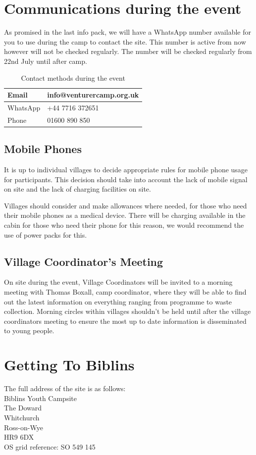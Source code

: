 \documentclass[a4paper, 11pt]{report}
\newcommand{\nl}{\newline}
\begin{document}
\chapter{Communications during the event}
As promised in the last info pack, we will have a WhatsApp number available for you to use during the camp to contact the site. This number is active from now however will not be checked regularly. The number will be checked regularly from 22nd July until after camp.
\begin{table}[H]
    \centering
    \begin{tabular}{p{} p{}}
        \hline
        Email & info@venturercamp.org.uk\\
        \hline
        WhatsApp & +44 7716 372651\\
        \hline
        Phone & 01600 890 850\\
        \hline
    \end{tabular}
    \caption{Contact methods during the event}
\end{table}

\section{Mobile Phones}
It is up to individual villages to decide appropriate rules for mobile phone usage for participants. This decision should take into account the lack of mobile signal on site and the lack of charging facilities on site.\nl

Villages should consider and make allowances where needed, for those who need their mobile phones as a medical device. There will be charging available in the cabin for those who need their phone for this reason, we would recommend the use of power packs for this. 

\section{Village Coordinator's Meeting}
On site during the event, Village Coordinators will be invited to a morning meeting with Thomas Boxall, camp coordinator, where they will be able to find out the latest information on everything ranging from programme to waste collection. Morning circles within villages shouldn't be held until after the village coordinators meeting to ensure the most up to date information is disseminated to young people. 

\chapter{Getting To Biblins}
The full address of the site is as follows:\\
Biblins Youth Campsite\\
The Doward\\
Whitchurch\\
Ross-on-Wye\\
HR9 6DX\\
OS grid reference: SO 549 145
\end{document}

